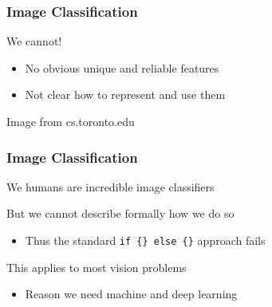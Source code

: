 \documentclass[xetex,professionalfont]{beamer}
\renewcommand\emph[1]{\textcolor{tuwcvl_cvl_blue}{#1}}
\begin{document}
\begin{frame}
\frametitle{Image Classification}

We cannot!
\begin{itemize}
    \item No obvious unique and reliable \emph{features} %
    \item Not clear how to represent and use them
\end{itemize}

\bigskip

\begin{center}
    {\centering Image from cs.toronto.edu}
\end{center}

\end{frame}


\begin{frame}
\frametitle{Image Classification}

We humans are incredible image classifiers

\bigskip

But we cannot describe formally how we do so
\begin{itemize}
    \item Thus the standard \texttt{if \{\} else \{\}} approach fails
\end{itemize}

\bigskip

This applies to most vision problems
\begin{itemize}
    \item Reason we need machine and deep learning
\end{itemize}

\end{frame}
\end{document}
